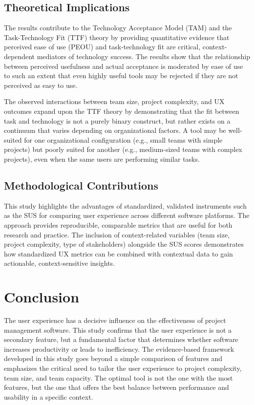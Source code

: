 \documentclass[runningheads]{llncs}
\begin{document}
\subsection{Theoretical Implications}
The results contribute to the Technology Acceptance Model (TAM) and the Task-Technology Fit (TTF) theory by providing quantitative evidence that perceived ease of use (PEOU) and task-technology fit are critical, context-dependent mediators of technology success. The results show that the relationship between perceived usefulness and actual acceptance is moderated by ease of use to such an extent that even highly useful tools may be rejected if they are not perceived as easy to use.

The observed interactions between team size, project complexity, and UX outcomes expand upon the TTF theory by demonstrating that the fit between task and technology is not a purely binary construct, but rather exists on a continuum that varies depending on organizational factors. A tool may be well-suited for one organizational configuration (e.g., small teams with simple projects) but poorly suited for another (e.g., medium-sized teams with complex projects), even when the same users are performing similar tasks.



\subsection{Methodological Contributions}
This study highlights the advantages of standardized, validated instruments such as the SUS for comparing user experience across different software platforms. The approach provides reproducible, comparable metrics that are useful for both research and practice. The inclusion of context-related variables (team size, project complexity, type of stakeholders) alongside the SUS scores demonstrates how standardized UX metrics can be combined with contextual data to gain actionable, context-sensitive insights.


\section{Conclusion}
The user experience has a decisive influence on the effectiveness of project management software. This study confirms that the user experience is not a secondary feature, but a fundamental factor that determines whether software increases productivity or leads to inefficiency. The evidence-based framework developed in this study goes beyond a simple comparison of features and emphasizes the critical need to tailor the user experience to project complexity, team size, and team capacity. The optimal tool is not the one with the most features, but the one that offers the best balance between performance and usability in a specific context.
\end{document}
